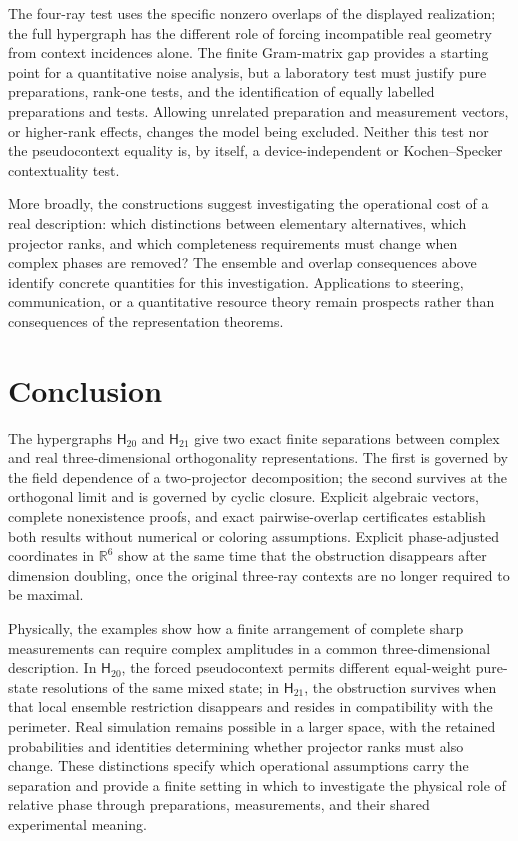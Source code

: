 \documentclass[twocolumn,aps,pra,floatfix,amsmath,amssymb,longbibliography]{revtex4-2}
\theoremstyle{definition}
\theoremstyle{remark}
\newcommand{\R}{\mathbb R}
\newcommand{\Htwenty}{\mathsf H_{20}}
\newcommand{\Htwentyone}{\mathsf H_{21}}
\begin{document}
The four-ray test uses the specific nonzero overlaps of the displayed
realization; the full hypergraph has the different role of forcing
incompatible real geometry from context incidences alone.  The finite
Gram-matrix gap provides a starting point for a quantitative noise
analysis, but a laboratory test must justify pure preparations, rank-one
tests, and the identification of equally labelled preparations and tests.
Allowing unrelated preparation and measurement vectors, or higher-rank
effects, changes the model being excluded.  Neither this test nor the
pseudocontext equality is, by itself, a device-independent or
Kochen--Specker contextuality test.

More broadly, the constructions suggest investigating the operational
cost of a real description: which distinctions between elementary
alternatives, which projector ranks, and which completeness requirements
must change when complex phases are removed?  The ensemble and overlap
consequences above identify concrete quantities for this investigation.
Applications to steering, communication, or a quantitative resource theory
remain prospects rather than consequences of the representation theorems.

\section{Conclusion}

The hypergraphs $\Htwenty$ and $\Htwentyone$ give two exact finite
separations between complex and real three-dimensional orthogonality
representations.  The first is governed by the field dependence of a
two-projector decomposition; the second survives at the orthogonal limit
and is governed by cyclic closure.  Explicit algebraic vectors,
complete nonexistence proofs, and exact pairwise-overlap certificates
establish both results without numerical or coloring assumptions.  Explicit
phase-adjusted coordinates in $\R^6$ show at the same time that the
obstruction disappears after dimension doubling, once the original
three-ray contexts are no longer required to be maximal.


Physically, the examples show how a finite arrangement of complete sharp
measurements can require complex amplitudes in a common three-dimensional
description.  In $\Htwenty$, the
forced pseudocontext permits different equal-weight pure-state resolutions
of the same mixed state; in $\Htwentyone$, the obstruction survives when
that local ensemble restriction disappears and resides in compatibility
with the perimeter.  Real simulation remains possible in a larger space,
with the retained probabilities and identities determining whether
projector ranks must also change.  These distinctions specify which
operational assumptions carry the separation and provide a finite
setting in which to investigate the physical role of relative phase
through preparations, measurements, and their shared experimental meaning.
\end{document}
